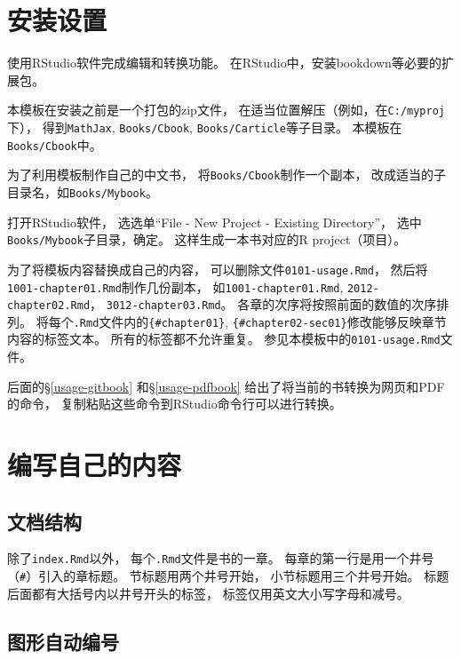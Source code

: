 \documentclass[
]{book}
\begin{document}
\hypertarget{usage-ins}{%
\section{安装设置}\label{usage-ins}}

使用RStudio软件完成编辑和转换功能。
在RStudio中，安装bookdown等必要的扩展包。

本模板在安装之前是一个打包的zip文件，
在适当位置解压（例如，在\texttt{C:/myproj}下），
得到\texttt{MathJax}, \texttt{Books/Cbook}, \texttt{Books/Carticle}等子目录。
本模板在\texttt{Books/Cbook}中。

为了利用模板制作自己的中文书，
将\texttt{Books/Cbook}制作一个副本，
改成适当的子目录名，如\texttt{Books/Mybook}。

打开RStudio软件，
选选单``File - New Project - Existing Directory''，
选中\texttt{Books/Mybook}子目录，确定。
这样生成一本书对应的R project（项目）。

为了将模板内容替换成自己的内容，
可以删除文件\texttt{0101-usage.Rmd}，
然后将\texttt{1001-chapter01.Rmd}制作几份副本，
如\texttt{1001-chapter01.Rmd}, \texttt{2012-chapter02.Rmd}，
\texttt{3012-chapter03.Rmd}。
各章的次序将按照前面的数值的次序排列。
将每个\texttt{.Rmd}文件内的\texttt{\{\#chapter01\}}, \texttt{\{\#chapter02-sec01\}}修改能够反映章节内容的标签文本。
所有的标签都不允许重复。
参见本模板中的\texttt{0101-usage.Rmd}文件。

后面的§\ref{usage-gitbook} 和§\ref{usage-pdfbook} 给出了将当前的书转换为网页和PDF的命令，
复制粘贴这些命令到RStudio命令行可以进行转换。

\hypertarget{usage-writing}{%
\section{编写自己的内容}\label{usage-writing}}

\hypertarget{usage-writing-struct}{%
\subsection{文档结构}\label{usage-writing-struct}}

除了\texttt{index.Rmd}以外，
每个\texttt{.Rmd}文件是书的一章。
每章的第一行是用一个井号（\texttt{\#}）引入的章标题。
节标题用两个井号开始，
小节标题用三个井号开始。
标题后面都有大括号内以井号开头的标签，
标签仅用英文大小写字母和减号。

\hypertarget{usage-writing-fig}{%
\subsection{图形自动编号}\label{usage-writing-fig}}
\end{document}
